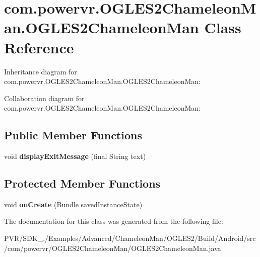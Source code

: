 \hypertarget{classcom_1_1powervr_1_1_o_g_l_e_s2_chameleon_man_1_1_o_g_l_e_s2_chameleon_man}{\section{com.\+powervr.\+O\+G\+L\+E\+S2\+Chameleon\+Man.\+O\+G\+L\+E\+S2\+Chameleon\+Man Class Reference}
\label{classcom_1_1powervr_1_1_o_g_l_e_s2_chameleon_man_1_1_o_g_l_e_s2_chameleon_man}
}


Inheritance diagram for com.\+powervr.\+O\+G\+L\+E\+S2\+Chameleon\+Man.\+O\+G\+L\+E\+S2\+Chameleon\+Man\+:


Collaboration diagram for com.\+powervr.\+O\+G\+L\+E\+S2\+Chameleon\+Man.\+O\+G\+L\+E\+S2\+Chameleon\+Man\+:
\subsection*{Public Member Functions}
\begin{DoxyCompactItemize}
\item 
\hypertarget{classcom_1_1powervr_1_1_o_g_l_e_s2_chameleon_man_1_1_o_g_l_e_s2_chameleon_man_a14e66df5e885d913aeec4ab7682cbf0f}{void {\bfseries display\+Exit\+Message} (final String text)}\label{classcom_1_1powervr_1_1_o_g_l_e_s2_chameleon_man_1_1_o_g_l_e_s2_chameleon_man_a14e66df5e885d913aeec4ab7682cbf0f}

\end{DoxyCompactItemize}
\subsection*{Protected Member Functions}
\begin{DoxyCompactItemize}
\item 
\hypertarget{classcom_1_1powervr_1_1_o_g_l_e_s2_chameleon_man_1_1_o_g_l_e_s2_chameleon_man_a7ab31be32792da15fe74408a2b2039ca}{void {\bfseries on\+Create} (Bundle saved\+Instance\+State)}\label{classcom_1_1powervr_1_1_o_g_l_e_s2_chameleon_man_1_1_o_g_l_e_s2_chameleon_man_a7ab31be32792da15fe74408a2b2039ca}

\end{DoxyCompactItemize}


The documentation for this class was generated from the following file\+:\begin{DoxyCompactItemize}
\item 
P\+V\+R/\+S\+D\+K\+\_./\+Examples/\+Advanced/\+Chameleon\+Man/\+O\+G\+L\+E\+S2/\+Build/\+Android/src/com/powervr/\+O\+G\+L\+E\+S2\+Chameleon\+Man/O\+G\+L\+E\+S2\+Chameleon\+Man.\+java\end{DoxyCompactItemize}
